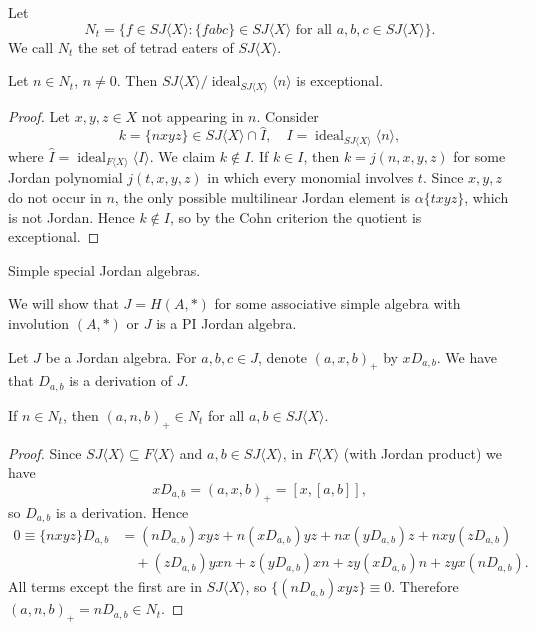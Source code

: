 \documentclass{article}
\begin{document}
\begin{definition}
Let
\[
N_t = \{ f \in SJ\langle X \rangle : \{fabc\} \in SJ\langle X \rangle \text{ for all } a, b, c \in SJ\langle X \rangle \}.
\]
We call $N_t$ the set of tetrad eaters of $SJ\langle X \rangle$.
\end{definition}

\begin{theorem}
Let $n \in N_t$, $n \neq 0$. Then $SJ\langle X \rangle / \operatorname{ideal}_{SJ\langle X \rangle}\langle n \rangle$ is exceptional.
\end{theorem}

\begin{proof}
Let $x, y, z \in X$ not appearing in $n$. Consider
\[
k = \{nxyz\} \in SJ\langle X \rangle \cap \hat{I}, \quad I = \operatorname{ideal}_{SJ\langle X \rangle}\langle n \rangle,
\]
where $\hat{I} = \operatorname{ideal}_{F\langle X \rangle}\langle I \rangle$.
We claim $k \notin I$. If $k \in I$, then $k = j(n, x, y, z)$ for some Jordan polynomial $j(t, x, y, z)$ in which every monomial involves $t$. Since $x, y, z$ do not occur in $n$, the only possible multilinear Jordan element is $\alpha \{txyz\}$, which is not Jordan. Hence $k \notin I$, so by the Cohn criterion the quotient is exceptional.
\end{proof}

Simple special Jordan algebras.

We will show that $J = H(A, *)$ for some associative simple algebra with involution $(A, *)$ or $J$ is a PI Jordan algebra.

Let $J$ be a Jordan algebra. For $a, b, c \in J$, denote $(a, x, b)_+$ by $x D_{a, b}$. We have that $D_{a, b}$ is a derivation of $J$.

\begin{lemma}
If $n \in N_t$, then $(a, n, b)_+ \in N_t$ for all $a, b \in SJ\langle X \rangle$.
\end{lemma}

\begin{proof}
Since $SJ\langle X \rangle \subseteq F\langle X \rangle$ and $a, b \in SJ\langle X \rangle$, in $F\langle X \rangle$ (with Jordan product) we have
\[
x D_{a, b} = (a, x, b)_+ = [x, [a, b]],
\]
so $D_{a, b}$ is a derivation. Hence
\[
\begin{aligned}
0 \equiv \{nxyz\} D_{a, b} &=
(n D_{a, b}) x y z + n(x D_{a, b}) y z + n x (y D_{a, b}) z + n x y (z D_{a, b}) \\
&\quad + (z D_{a, b}) y x n + z (y D_{a, b}) x n + z y (x D_{a, b}) n + z y x (n D_{a, b}).
\end{aligned}
\]
All terms except the first are in $SJ\langle X \rangle$, so $\{(n D_{a, b}) x y z\} \equiv 0$. Therefore $(a, n, b)_+ = n D_{a, b} \in N_t$.
\end{proof}
\end{document}
